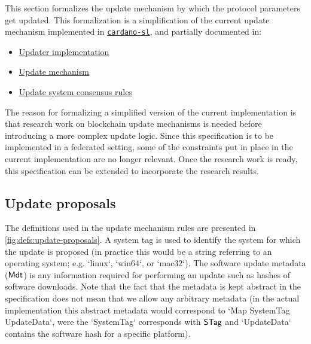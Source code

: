 This section formalizes the update mechanism by which the protocol parameters
get updated. This formalization is a simplification of the current update
mechanism implemented in
\href{https://github.com/input-output-hk/cardano-sl/}{\texttt{cardano-sl}}, and
partially documented in:
\begin{itemize}
\item \href{https://cardanodocs.com/technical/updater/}{Updater implementation}
\item \href{https://cardanodocs.com/cardano/update-mechanism/}{Update mechanism}
\item
  \href{https://github.com/input-output-hk/cardano-sl/blob/2a19d8ce2941b8e60f0208a5198943ec2ada1fd4/docs/block-processing/us.md}{Update system consensus rules}
\end{itemize}

The reason for formalizing a simplified version of the current implementation
is that research work on blockchain update mechanisms is needed before
introducing a more complex update logic. Since this specification is to be
implemented in a federated setting, some of the constraints put in place in the
current implementation are no longer relevant. Once the research work is ready,
this specification can be extended to incorporate the research results.

\subsection{Update proposals}
\label{sec:update-proposals}

The definitions used in the update mechanism rules are presented in
\cref{fig:defs:update-proposals}. A system tag is used to identify the system
for which the update is proposed (in practice this would be a string referring
to an operating system; e.g. `linux`, `win64`, or `mac32`). The software update
metadata ($\mathsf{Mdt}$) is any information required for performing an update
such as hashes of software downloads. Note that the fact that the metadata is
kept abstract in the specification does not mean that we allow any arbitrary
metadata (in the actual implementation this abstract metadata would correspond
to `Map SystemTag UpdateData`, were the `SystemTag` corresponds with $\mathsf{STag}$
and `UpdateData` contains the software hash for a specific platform).

